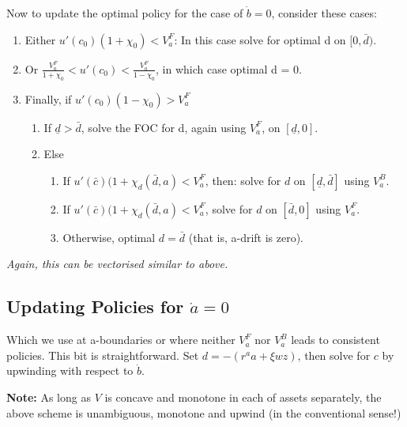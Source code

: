 \documentclass[11pt]{article}
\begin{document}
Now to update the optimal policy for the case of \(\dot{b}=0\), consider these cases:
\begin{enumerate}
\item Either \(u'(c_0)(1+\chi_0) < V_a^{F}\): In this case solve for optimal d on \([0,\bar{d})\).
\item Or \(\frac{V_a^{F}}{1+\chi_0} < u'(c_0) < \frac{V_a^{F}}{1-\chi_0}\), in which case optimal d = 0.
\item Finally, if \(u'(c_0)(1-\chi_0) > V_a^{F}\)
\begin{enumerate}
\item If \(\underline{d} > \bar{d}\), solve the FOC for d, again using \(V_a^F\), on \([\underline{d},0]\).
\item Else
\begin{enumerate}
\item If \(u'(\bar{c})(1+\chi_d(\bar{d},a) < V_a^F\), then: solve for \(d\) on \([ \underline{d}, \bar{d} ]\) using \(V_a^B\).
\item If \(u'(\bar{c})(1+\chi_d(\bar{d},a) < V_a^F\), solve for \(d\) on \([ \bar{d}, 0]\) using \(V_a^F\).
\item Otherwise, optimal \(d = \bar{d}\) (that is, a-drift is zero).
\end{enumerate}
\end{enumerate}
\end{enumerate}

\emph{Again, this can be vectorised similar to above.}

\subsection{Updating Policies for \(\dot{a}=0\)}
\label{sec:orgdc9dd73}
Which we use at a-boundaries or where neither \(V_a^F\) nor \(V_a^B\) leads to consistent policies. This bit is straightforward. Set \(d = - (r^a a + \xi w z)\), then solve for \(c\) by upwinding with respect to \(\dot{b}\).

\textbf{Note:} As long as \(V\) is concave and monotone in each of assets separately, the above scheme is unambiguous, monotone and upwind (in the conventional sense!)


\newpage


\end{document}
